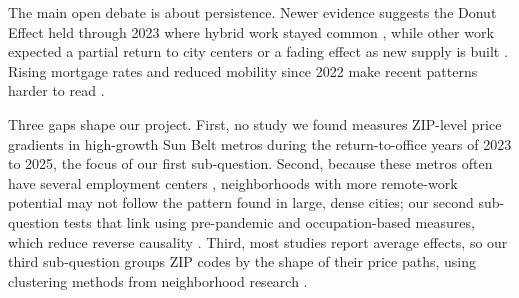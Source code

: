 \documentclass[11pt]{article}
\begin{document}
The main open debate is about persistence. Newer evidence suggests the Donut Effect held through 2023 where hybrid work stayed common \cite{mondragon2022housing,ramani2024reshapes}, while other work expected a partial return to city centers \cite{gupta2022flattening} or a fading effect as new supply is built \cite{howard2023short}. Rising mortgage rates and reduced mobility since 2022 make recent patterns harder to read \cite{fonseca2024mortgage}.

Three gaps shape our project. First, no study we found measures ZIP-level price gradients in high-growth Sun Belt metros during the return-to-office years of 2023 to 2025, the focus of our first sub-question. Second, because these metros often have several employment centers \cite{waddell1993residential,leslie2010identification}, neighborhoods with more remote-work potential may not follow the pattern found in large, dense cities; our second sub-question tests that link using pre-pandemic and occupation-based measures, which reduce reverse causality \cite{dingel2020jobs,mondragon2022housing}. Third, most studies report average effects, so our third sub-question groups ZIP codes by the shape of their price paths, using clustering methods from neighborhood research \cite{delmelle2016mapping,delmelle2025time,genolini2010kml}.
\end{document}
